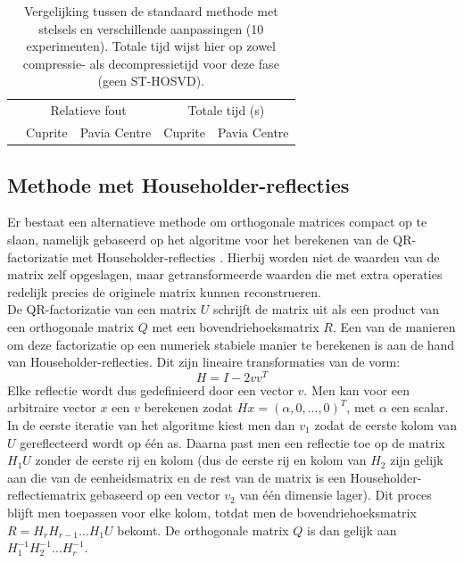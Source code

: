 \begin{table}[H]
\centering
\begin{tabular}{|l|c|c|c|c|}
\hline
\multirow{2}{*}{} & \multicolumn{2}{c|}{Relatieve fout} & \multicolumn{2}{c|}{Totale tijd (s)} \\ \cline{2-5} 
 & Cuprite & Pavia Centre & Cuprite & Pavia Centre \\ \hline
                             
\end{tabular}
\caption{Vergelijking tussen de standaard methode met stelsels en verschillende aanpassingen (10 experimenten). Totale tijd wijst hier op zowel compressie- als decompressietijd voor deze fase (geen ST-HOSVD).}
\label{table:orthogonality-compression-systems-summary}
\end{table}

\newpage
\subsection{Methode met Householder-reflecties}

Er bestaat een alternatieve methode om orthogonale matrices compact op te slaan, namelijk gebaseerd op het algoritme voor het berekenen van de QR-factorizatie met Householder-reflecties \cite{ref:qr_factorization_householder}. Hierbij worden niet de waarden van de matrix zelf opgeslagen, maar getransformeerde waarden die met extra operaties redelijk precies de originele matrix kunnen reconstrueren.\\

De QR-factorizatie van een matrix $U$ schrijft de matrix uit als een product van een orthogonale matrix $Q$ met een bovendriehoeksmatrix $R$. Een van de manieren om deze factorizatie op een numeriek stabiele manier te berekenen is aan de hand van Householder-reflecties. Dit zijn lineaire transformaties van de vorm:
\[
H = I - 2vv^T
\]
Elke reflectie wordt dus gedefinieerd door een vector $v$. Men kan voor een arbitraire vector $x$ een $v$ berekenen zodat $Hx = (\alpha, 0, \dots, 0)^T$, met $\alpha$ een scalar. In de eerste iteratie van het algoritme kiest men dan $v_1$ zodat de eerste kolom van $U$ gereflecteerd wordt op \'e\'en as. Daarna past men een reflectie toe op de matrix $H_1 U$ zonder de eerste rij en kolom (dus de eerste rij en kolom van $H_2$ zijn gelijk aan die van de eenheidsmatrix en de rest van de matrix is een Householder-reflectiematrix gebaseerd op een vector $v_2$ van \'e\'en dimensie lager). Dit proces blijft men toepassen voor elke kolom, totdat men de bovendriehoeksmatrix $R = H_r H_{r-1} \dots H_1 U$ bekomt. De orthogonale matrix $Q$ is dan gelijk aan $H_1^{-1} H_2^{-1} \dots H_r^{-1}$.\\


